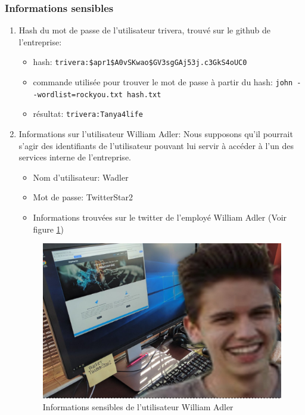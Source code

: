 \documentclass[french,paper=a4,oneside,captions=tableheading]{article}
\begin{document}
\subsubsection{Informations sensibles}

\begin{enumerate}
    \item Hash du mot de passe de l'utilisateur trivera, trouvé sur le github de l'entreprise:
    \begin{itemize}
        \item hash: \texttt{trivera{}:\$apr1\$A0vSKwao\$GV3sgGAj53j.c3GkS4oUC0}
        \item commande utilisée pour trouver le mot de passe à partir du hash: \texttt{john -{}-wordlist=rockyou.txt hash.txt}
        \item résultat: \texttt{trivera{}:Tanya4life}
    \end{itemize}
    
    \item Informations sur l'utilisateur William Adler:
    Nous supposons qu'il pourrait s'agir des identifiants de l'utilisateur pouvant lui servir à accéder à l'un des services interne de l'entreprise.
    \begin{itemize}
        \item Nom d'utilisateur: Wadler
        \item Mot de passe: TwitterStar2
        \item Informations trouvées sur le twitter de l'employé William Adler (Voir figure \ref{SensitiveInformations})
    \end{itemize}
    \begin{figure}[H]
        \centering
        \includegraphics[width=15cm]{images/InformationSensibleWilliamAdler.png}
        \caption{Informations sensibles de l'utilisateur William Adler}
        \label{SensitiveInformations}
    \end{figure}
\end{enumerate}
\end{document}
